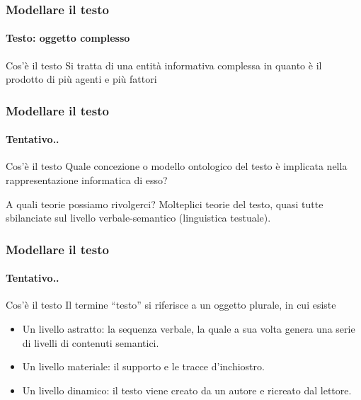 \begin{frame}
	\frametitle{Modellare il testo}
	\framesubtitle{Testo: oggetto complesso}
	\addtocounter{nframe}{1}

	\begin{block}{Cos'è il testo}
		Si tratta di una entità informativa complessa in quanto è il prodotto di più agenti e più fattori
	\end{block}

\end{frame}

\begin{frame}
	\frametitle{Modellare il testo}
	\framesubtitle{Tentativo..}
	\addtocounter{nframe}{1}

	\begin{block}{Cos'è il testo}
		Quale concezione o modello ontologico del testo è implicata nella rappresentazione informatica di esso?
	\end{block}

	\begin{block}{A quali teorie possiamo rivolgerci?}
		Molteplici teorie del testo, quasi tutte sbilanciate sul livello verbale-semantico (linguistica testuale).
	\end{block}

\end{frame}

\begin{frame}
	\frametitle{Modellare il testo}
	\framesubtitle{Tentativo..}
	\addtocounter{nframe}{1}

	\begin{block}{Cos'è il testo}
		Il termine ``testo''  si riferisce a un oggetto plurale, in cui esiste
		\begin{itemize}
			\item Un livello astratto: la sequenza verbale, la quale a sua volta genera una serie di livelli di contenuti semantici.
			\item Un livello materiale: il supporto e le tracce d’inchiostro.
			\item Un livello dinamico: il testo viene creato da un autore e ricreato dal lettore.
		\end{itemize}

	\end{block}

\end{frame}


